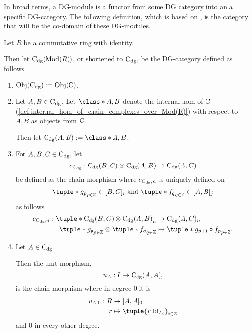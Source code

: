 In broad terms, a DG-module is a functor from some DG category into an a specific DG-category. The following definition, which is based on \cite[p. 29]{Jasso-Muro_2023}, is the category that will be the co-domain of these DG-modules.

\begin{definition}[\( \C_{\dg} \)]
    \label{def:c_dg_mod_r}
    Let \( R \) be a commutative ring with identity.

    Then let \emph{\( \operatorname{C}_{\operatorname{dg}}(\operatorname{Mod}(R)) \)}, or shortened to \emph{\( \C_{\dg} \)}, be the DG-category defined as follows
    \begin{enumerate}
        \item {
            \( \operatorname{Obj}(\operatorname{C}_{\operatorname{dg}}) := \operatorname{Obj}(\operatorname{C}) \).
        }
        \item {
            Let \( A, B \in \operatorname{C}_{\operatorname{dg}} \). Let \( \class*{A, B} \) denote the internal hom of \( \operatorname{C} \) (\autoref{def:internal_hom_of_chain_complexes_over_Mod(R)}) with respect to \( A, B \) as objects from \( \operatorname{C} \).

            Then let \( \C_{\dg}(A, B) := \class*{A, B} \).
        }
        \item {
            For \( A, B, C \in \operatorname{C}_{\operatorname{dg}} \), let
            \[
                c_{\operatorname{C}_{\operatorname{dg}}}: \operatorname{C}_{\operatorname{dg}}(B, C) \otimes \operatorname{C}_{\operatorname{dg}}(A, B) \to \operatorname{C}_{\operatorname{dg}}(A, C)
            \]
            be defined as the chain morphism where \( c_{\operatorname{C}_{\operatorname{dg}}, n} \) is uniquely defined on
            \[
                \tuple*{g_p}_{p \in \Zb} \in [B, C]_i \text{ and } \tuple*{f_q}_{q \in \Zb} \in [A, B]_j
            \]
            as follows
            \begin{align*}
                c_{\C_{\dg}, n}: \tuple*{ \C_{\dg}(B, C) \otimes \C_{\dg}(A, B) }_n &\to \C_{\dg}(A, C)_n \\
                \tuple*{g_p}_{p \in \Zb} \otimes \tuple*{f_q}_{q \in \Zb} &\mapsto \tuple*{g_{p + j} \circ f_p}_{p \in \Zb}.
            \end{align*}
        }
        \item {
            Let \( A \in \operatorname{C}_{\operatorname{dg}} \).

            Then the unit morphism,
            \[
                u_A: I \to \operatorname{C}_{\operatorname{dg}}(A, A),
            \]
            is the chain morphism where in degree \( 0 \) it is
            \begin{align*}
                u_{A, 0} : R &\to [A, A]_0 \\
                r &\mapsto \tuple{r\Id_{A_i}}_{i \in \Zb}
            \end{align*}
            and \( 0 \) in every other degree.
        }
    \end{enumerate}
\end{definition}

